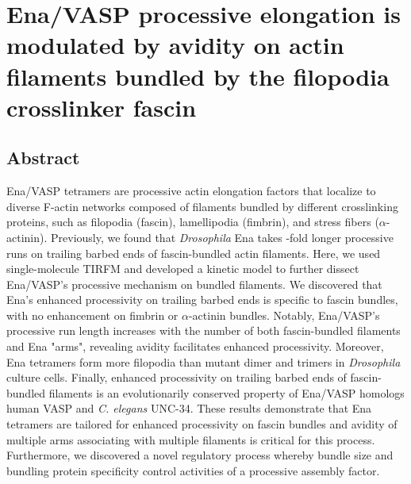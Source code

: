 

\chapter{Ena/VASP processive elongation is modulated by avidity on actin filaments bundled by the filopodia crosslinker fascin}\label{ch:ena}

\section[Abstract]{Abstract\footnotemark}
Ena/VASP tetramers are processive actin elongation factors that localize to diverse F-actin networks composed of filaments bundled by different crosslinking proteins, such as filopodia (fascin), lamellipodia (fimbrin), and stress fibers ($\alpha$-actinin). Previously, we found that \textit{Drosophila} Ena takes -fold longer processive runs on trailing barbed ends of fascin-bundled actin filaments. Here, we used single-molecule TIRFM and developed a kinetic model to further dissect Ena/VASP's processive mechanism on bundled filaments. We discovered that Ena's enhanced processivity on trailing barbed ends is specific to fascin bundles, with no enhancement on fimbrin or $\alpha$-actinin bundles. Notably, Ena/VASP's processive run length increases with the number of both fascin-bundled filaments and Ena "arms", revealing avidity facilitates enhanced processivity. Moreover, Ena tetramers form more filopodia than mutant dimer and trimers in \textit{Drosophila} culture cells. Finally, enhanced processivity on trailing barbed ends of fascin-bundled filaments is an evolutionarily conserved property of Ena/VASP homologs human VASP and \textit{C. elegans} UNC-34. These results demonstrate that Ena tetramers are tailored for enhanced processivity on fascin bundles and avidity of multiple arms associating with multiple filaments is critical for this process. Furthermore, we discovered a novel regulatory process whereby bundle size and bundling protein specificity control activities of a processive assembly factor.


